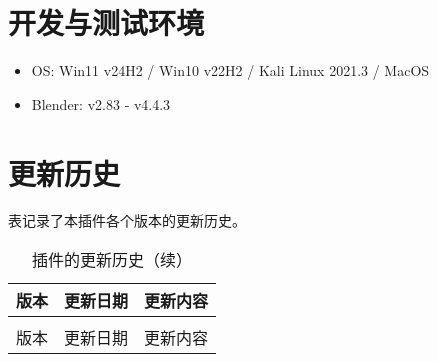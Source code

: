 \documentclass{../../public_resources/doc}
\begin{document}
\section{开发与测试环境}
\begin{itemize}
    \item OS: Win11 v24H2 / Win10 v22H2 / Kali Linux 2021.3 / MacOS
    \item Blender: v2.83 ‑ v4.4.3
\end{itemize}

\section{更新历史}
表记录了本插件各个版本的更新历史。
\begin{longtable}{|*{2}{c|}m{300pt}|}
    \caption{插件的更新历史}\label{更新历史} \\
    \hline
    版本 & 更新日期 & \multicolumn{1}{c|}{更新内容} \\
    \hline
    \endfirsthead

    \caption{插件的更新历史（续）} \\
    \hline
    版本 & 更新日期 & \multicolumn{1}{c|}{更新内容} \\
    \hline
    \endhead


\end{longtable}
\end{document}
